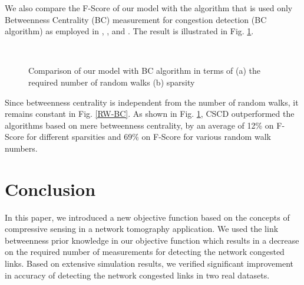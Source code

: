 \documentclass{article}
\begin{document}
We also compare the F-Score of our model with the algorithm that is used only Betweenness Centrality (BC) measurement for congestion detection (BC algorithm) as employed in \cite{BC1}, \cite{BC2}, and \cite{BC3}. The result is illustrated in Fig. \ref{MereBC}.
\begin{figure}[h]
\centering
{}~
\caption{Comparison of our model with BC algorithm in terms of (a) the required number of random walks (b) sparsity}
\label{MereBC}
\end{figure}
Since betweenness centrality is independent from the number of random walks, it remains constant in Fig. \ref{RW-BC}.
As shown in Fig. \ref{MereBC}, CSCD outperformed the algorithms based on mere betweenness centrality, by an average of 12\% on F-Score for different sparsities and 69\% on F-Score for various random walk numbers.
\section{Conclusion} 
\label{Conclusion}
In this paper, we introduced a new objective function based on the concepts of compressive sensing in a network tomography application. We used the link betweenness prior knowledge in our objective function which results in a decrease on the required number of measurements for detecting the network congested links. Based on extensive simulation results, we verified significant improvement in accuracy of detecting the network congested links in two real datasets. 

\end{document}
